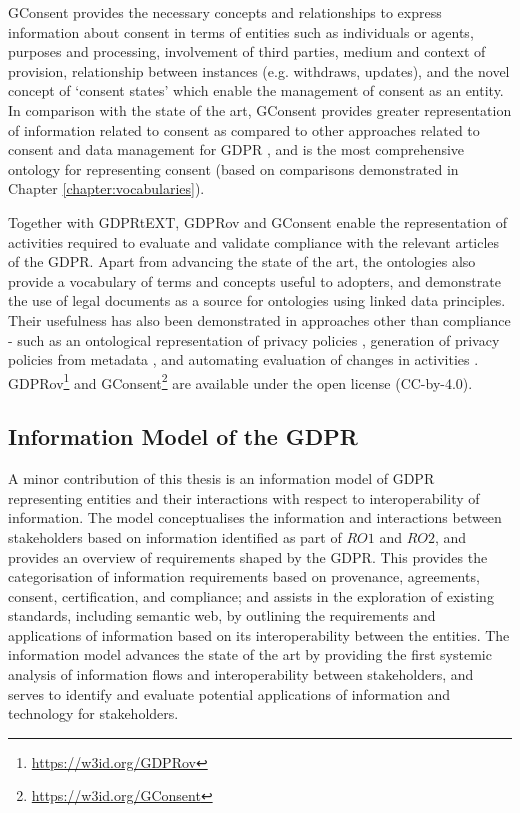 GConsent provides the necessary concepts and relationships to express information about consent in terms of entities such as individuals or agents, purposes and processing, involvement of third parties, medium and context of provision, relationship between instances (e.g. withdraws, updates), and the novel concept of `consent states' which enable the management of consent as an entity. 
In comparison with the state of the art, GConsent provides greater representation of information related to consent as compared to other approaches related to consent and data management for GDPR \cite{peras_guidelines_2018}, and is the most comprehensive ontology for representing consent (based on comparisons demonstrated in Chapter \ref{chapter:vocabularies}).

Together with GDPRtEXT, GDPRov and GConsent enable the representation of activities required to evaluate and validate compliance with the relevant articles of the GDPR. Apart from advancing the state of the art, the ontologies also provide a vocabulary of terms and concepts useful to adopters, and demonstrate the use of legal documents as a source for ontologies using linked data principles.
Their usefulness has also been demonstrated in approaches other than compliance - such as an ontological representation of privacy policies \cite{pandit_ontology_2018}, generation of privacy policies from metadata \cite{pandit_personalised_2018}, and automating evaluation of changes in activities \cite{pandit_gdpr-driven_2018}.
GDPRov\footnote{\url{https://w3id.org/GDPRov}} and GConsent\footnote{\url{https://w3id.org/GConsent}} are available under the open license (CC-by-4.0).

\subsection{Information Model of the GDPR}
A minor contribution of this thesis is an information model of GDPR representing entities and their interactions with respect to interoperability of information.
The model conceptualises the information and interactions between stakeholders based on information identified as part of $RO1$ and $RO2$, and provides an overview of requirements shaped by the GDPR.
This provides the categorisation of information requirements based on provenance, agreements, consent, certification, and compliance; and assists in the exploration of existing standards, including semantic web, by outlining the requirements and applications of information based on its interoperability between the entities.
The information model advances the state of the art by providing the first systemic analysis of information flows and interoperability between stakeholders, and serves to identify and evaluate potential applications of information and technology for stakeholders.

